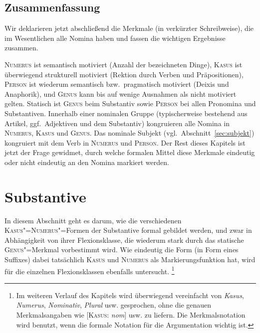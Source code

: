 \subsection{Zusammenfassung}

Wir deklarieren jetzt abschließend die Merkmale (in verkürzter Schreibweise), die im Wesentlichen alle Nomina haben und fassen die wichtigen Ergebnisse zusammen.

\begin{exe}
\end{exe}

\textsc{Numerus} ist semantisch motiviert (Anzahl der bezeichneten Dinge), \textsc{Kasus} ist überwiegend strukturell motiviert (Rektion durch Verben und Präpositionen), \textsc{Person} ist wiederum semantisch bzw.\ pragmatisch motiviert (Deixis und Anaphorik), und \textsc{Genus} kann bis auf wenige Ausnahmen als nicht motiviert gelten.
Statisch ist \textsc{Genus} beim Substantiv sowie \textsc{Person} bei allen Pronomina und Substantiven.
Innerhalb einer nominalen Gruppe (typischerweise bestehend aus Artikel, ggf.\ Adjektiven und dem Substantiv) kongruieren alle Nomina in \textsc{Numerus}, \textsc{Kasus} und \textsc{Genus}.
Das nominale Subjekt (vgl.\ Abschnitt~\ref{sec:subjekt}) kongruiert mit dem Verb in \textsc{Numerus} und \textsc{Person}.
Der Rest dieses Kapitels ist jetzt der Frage gewidmet, durch welche formalen Mittel diese Merkmale eindeutig oder nicht eindeutig an den Nomina markiert werden.




\section{Substantive}

\label{sec:subst}

In diesem Abschnitt geht es darum, wie die verschiedenen \textsc{Kasus}"=\textsc{Numerus}"=Formen der Substantive formal gebildet werden, und zwar in Abhängigkeit von ihrer Flexionsklasse, die wiederum stark durch das statische \textsc{Genus}"=Merkmal vorbestimmt wird.
Wie eindeutig die Form (\zB in Form eines Suffixes) dabei tatsächlich \textsc{Kasus} und \textsc{Numerus} als Markierungsfunktion hat, wird für die einzelnen Flexionsklassen ebenfalls untersucht.%
\footnote{Im weiteren Verlauf des Kapitels wird überwiegend vereinfacht von \textit{Kasus}, \textit{Numerus}, \textit{Nominativ}, \textit{Plural} usw. gesprochen, ohne die genauen Merkmalsangaben wie [\textsc{Kasus}: \textit{nom}] usw. zu liefern.
Die Merkmalsnotation wird benutzt, wenn die formale Notation für die Argumentation wichtig ist.}

